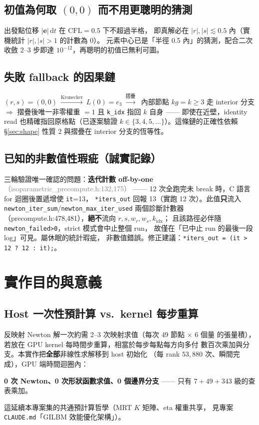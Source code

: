 \documentclass[11pt,a4paper]{article}
\newcommand{\code}[1]{\texttt{#1}}
\newcommand{\filewhere}[1]{\textcolor{gray}{\small（#1）}}
\begin{document}
\subsection{初值為何取 $(0,0)$ 而不用更聰明的猜測}
出發點位移 $|\bm{e}|\,\mathrm{d}t$ 在 $\mathrm{CFL}=0.5$ 下不超過半格，
即真解必在 $|r|,|s|\lesssim0.5$ 內（實機統計 $|r|,|s|>1$ 的計數為 0）。
元素中心已是「半徑 0.5 內」的猜測，配合二次收斂 2--3 步即達
$10^{-12}$，再聰明的初值已無利可圖。

\subsection{失敗 fallback 的因果鏈}
$(r,s)=(0,0)\ \xrightarrow{\text{Kronecker}}\ L(0)=e_3
\ \xrightarrow{\text{摺疊}}\ $ 內部節點 $kg=k\ge3$ 走 interior 分支
$\Rightarrow$ 摺疊後唯一非零權重 $=1$ 且 \code{k\_idx} 指回 $k$ 自身
—— 即使在近壁，identity read 也精確指回原格點（已逐案驗證
$k\in\{3,4,5,\dots\}$）。這條鏈的正確性依賴 \S\ref{sec:shape}
性質 2 與摺疊在 interior 分支的恆等性。

\subsection{已知的非數值性瑕疵（誠實記錄）}
三輪驗證唯一確認的問題：\textbf{迭代計數 off-by-one}
\filewhere{isoparametric\_precompute.h:132,175} ——
12 次全跑完未 break 時，C 語言 for 迴圈後置遞增使 \code{it}=13，
\code{*iters\_out} 回報 13（實跑 12 次）。此值\textbf{只}流入
\code{newton\_iter\_sum}/\code{newton\_max\_iter\_used} 兩個診斷計數器
（precompute.h:478,481），\textbf{絕不}流向 $r,s,w_r,w_s,k_{\mathrm{idx}}$；
且該路徑必伴隨 \code{newton\_failed>0}，strict 模式會中止整個 run，
故僅在「已中止 run 的最後一段 log」可見。屬休眠的統計瑕疵，
非數值錯誤。修正建議：\code{*iters\_out = (it > 12 ? 12 : it);}。

\section{實作目的與意義}
\label{sec:purpose}

\subsection{Host 一次性預計算 vs.\ kernel 每步重算}
反映射 Newton 解一次約需 2--3 次映射求值（每次 $49$ 節點 $\times$ 6 個量
的張量積），若放在 GPU kernel 每時間步重算，相當於每步每點每方向多付
數百次乘加與分支。本實作把\textbf{全部}非線性求解移到 host 初始化
（每 rank $53{,}880$ 次、瞬間完成），GPU 端時間迴圈內：
\begin{center}
\textbf{0 次 Newton、0 次形狀函數求值、0 個邊界分支} —— 只有
$7{+}49{+}343$ 級的查表乘加。
\end{center}
這延續本專案集的共通預計算哲學（MRT $K$ 矩陣、eta 權重共享，
見專案 \code{CLAUDE.md}「GILBM 效能優化架構」）。
\end{document}
